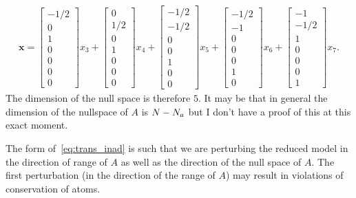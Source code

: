 \begin{align}
  \mathbf{x} = 
  \begin{bmatrix} -1/2 \\ 0 \\ 1 \\ 0 \\ 0 \\ 0 \\ 0 \end{bmatrix}x_{3} 
  + 
  \begin{bmatrix} 0 \\ 1/2 \\ 0 \\ 1 \\ 0 \\ 0 \\ 0 \end{bmatrix}x_{4} 
  + 
  \begin{bmatrix} -1/2 \\ \displaystyle -1/2 \\ 0 \\ 0 \\ 1 \\ 0 \\ 0 \end{bmatrix}x_{5} 
  + 
  \begin{bmatrix} -1/2 \\ -1 \\ 0 \\ 0 \\ 0 \\ 1 \\ 0 \end{bmatrix}x_{6} 
  + 
  \begin{bmatrix} -1 \\ -1/2 \\ 1 \\ 0 \\ 0 \\ 0 \\ 1 \end{bmatrix}x_{7}.
\end{align}
The dimension of the null space is therefore $5$.  It may be that in general 
the dimension of the nullspace of $A$ is $N - N_{a}$ but I don't have a 
proof of this at this exact moment.

The form of~\eqref{eq:trans_inad} is such that we are perturbing the 
reduced model in the direction of range of $A$ as well as the direction 
of the null space of $A$.  The first perturbation (in the direction 
of the range of $A$) may result in violations of conservation of atoms.

